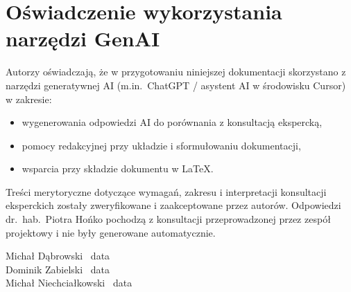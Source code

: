 \section{Oświadczenie wykorzystania narzędzi GenAI}

Autorzy oświadczają, że w przygotowaniu niniejszej dokumentacji skorzystano z narzędzi generatywnej AI (m.in.\ ChatGPT / asystent AI w środowisku Cursor) w zakresie:

\begin{itemize}
	\item wygenerowania odpowiedzi AI do porównania z konsultacją ekspercką,
	\item pomocy redakcyjnej przy układzie i sformułowaniu dokumentacji,
	\item wsparcia przy składzie dokumentu w \LaTeX.
\end{itemize}

Treści merytoryczne dotyczące wymagań, zakresu i interpretacji konsultacji eksperckich zostały zweryfikowane i zaakceptowane przez autorów. Odpowiedzi dr.\ hab.\ Piotra Hońko pochodzą z konsultacji przeprowadzonej przez zespół projektowy i nie były generowane automatycznie.

\vspace{1.5cm}
\begin{flushleft}
Michał Dąbrowski \dotfill\ data \dotfill \\[1.2cm]
Dominik Zabielski \dotfill\ data \dotfill \\[1.2cm]
Michał Niechciałkowski \dotfill\ data \dotfill
\end{flushleft}
